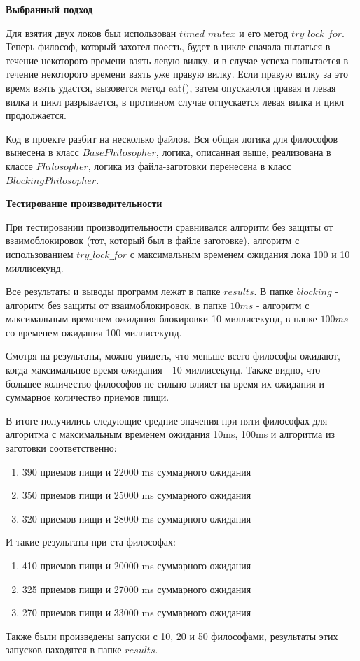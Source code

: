 \documentclass{article}
\begin{document}
    \textbf {Выбранный подход}

    Для взятия двух локов был использован $timed\_mutex$ и его метод $try\_lock\_for$.
    Теперь философ, который захотел поесть, будет в цикле сначала пытаться в течение некоторого времени взять левую вилку,
    и в случае успеха попытается в течение некоторого времени взять уже правую вилку.
    Если правую вилку за это время взять удастся, вызовется метод eat(), затем опускаются правая и левая вилка и цикл разрывается,
    в противном случае отпускается левая вилка и цикл продолжается.

    Код в проекте разбит на несколько файлов.
    Вся общая логика для философов вынесена в класс $BasePhilosopher$, логика, описанная выше, реализована в классе $Philosopher$,
    логика из файла-заготовки перенесена в класс $BlockingPhilosopher$.

    \textbf {Тестирование производительности}

    При тестировании производительности  сравнивался алгоритм без защиты от взаимоблокировок (тот, который был в файле заготовке),
    алгоритм с использованием $try\_lock\_for$ с максимальным временем ожидания лока 100 и 10 миллисекунд.

    Все результаты и выводы программ лежат в папке $results$.
    В папке $blocking$ - алгоритм без защиты от взаимоблокировок, в папке $10ms$ - алгоритм с максимальным временем ожидания
    блокировки 10 миллисекунд, в папке $100ms$ - со временем ожидания 100 миллисекунд.

    Смотря на результаты, можно увидеть, что меньше всего философы ожидают, когда максимальное время ожидания - 10 миллисекунд.
    Также видно, что большее количество философов не сильно влияет на время их ожидания и суммарное количество приемов пищи.

    В итоге получились следующие средние значения при пяти философах для алгоритма с максимальным временем ожидания
    10ms, 100ms и алгоритма из заготовки соответственно:

    \begin{enumerate}
        \item 390 приемов пищи и 22000 ms суммарного ожидания
        \item 350 приемов пищи и 25000 ms суммарного ожидания
        \item 320 приемов пищи и 28000 ms суммарного ожидания
    \end{enumerate}

    И такие результаты при ста философах:

    \begin{enumerate}
        \item 410 приемов пищи и 20000 ms суммарного ожидания
        \item 325 приемов пищи и 27000 ms суммарного ожидания
        \item 270 приемов пищи и 33000 ms суммарного ожидания
    \end{enumerate}

    Также были произведены запуски с 10, 20 и 50 философами, результаты этих запусков находятся в папке $results$.
\end{document}
